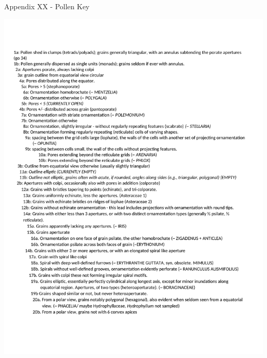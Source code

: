 \documentclass[
]{article}
\begin{document}
\newpage

Appendix XX - Pollen Key

\includegraphics{../graphics/assorted/RMBL_pollen_key-1.pdf}

\newpage
\end{document}
